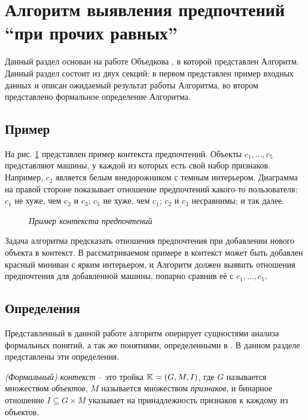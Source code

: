	
\section{Алгоритм выявления предпочтений \enquote{при прочих равных}}

	Данный раздел основан на работе Объедкова \cite{Obiedkov:2013}, в которой представлен Алгоритм. Данный раздел состоит из двух секций: в первом представлен пример входных данных и описан ожидаемый результат работы Алгоритма, во втором представлено формальное определение Алгоритма.
	
	\subsection{Пример}
	\label{subsection:example}
		На рис. \ref{fig:pcxt} представлен пример контекста предпочтений. Объекты $c_1, \dots, c_5$ представляют машины, у каждой из которых есть свой набор признаков. Например, $c_2$ является белым внедорожником с темным интерьером. Диаграмма на правой стороне показывает отношение предпочтений какого-то пользователя: $c_1$ не хуже, чем $c_2$ и $c_3$; $c_5$ не хуже, чем $c_1$; $c_2$ и $c_3$ несравнимы; и так далее. 
		\begin{figure}
			\begin{center} 
				\cars \prefs
				\caption{\it Пример контекста предпочтений \cite[Рис.~1.1]{Obiedkov:2013}}
				\label{fig:pcxt}	
			\end{center} 
		\end{figure} 
		
		Задача алгоритма предсказать отношения предпочтения при добавлении нового объекта в контекст. В рассматриваемом примере в контекст может быть добавлен красный миниван с ярким интерьером, и Алгоритм должен выявить отношения предпочтения для добавленной машины, попарно сравнив её с $c_1, \dots, c_5$. 
	
	\subsection{Определения}
	\label{subsection:definitions}
		Представленный в данной работе алгоритм оперирует сущностями анализа формальных понятий\cite{Ganter:1999}, а так же понятиями, определенными в \cite{Obiedkov:2012:preferences,Obiedkov:2012:modeling}. В данном разделе представлены эти определения.
		
		
		\begin{definition}
			\emph{(Формальный) контекст} – это тройка $\mathbb{K} = (G, M, I)$, где $G$ называется множеством \emph{объектов}, $M$ называется множеством \emph{признаков}, и бинарное отношение ${I \subseteq G \times M}$ указывает на принадлежность признаков к каждому из объектов.
		\end{definition}
		
